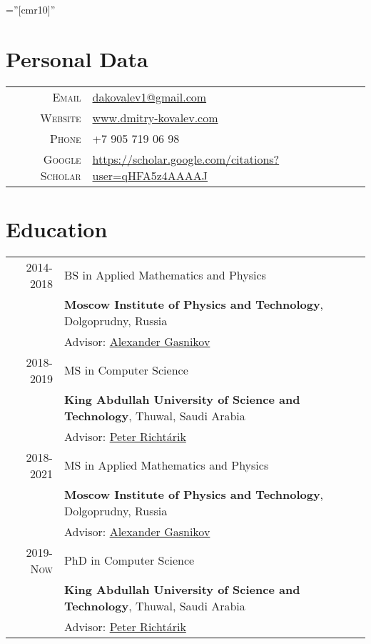 \documentclass[a4paper,10pt]{article} %
\begin{document}
\pagestyle{empty} %

\font\fb=''[cmr10]'' %


\par{\bigskip\par} %

\section{Personal Data}

\begin{tabular}{rl}
\textsc{Email} & \href{mailto:dakovalev1@gmail.com}{dakovalev1@gmail.com}\\
\textsc{Website} & \href{https://www.dmitry-kovalev.com}{www.dmitry-kovalev.com}\\
\textsc{Phone} & +7 905 719 06 98\\
\textsc{Google Scholar} &\href{https://scholar.google.com/citations?user=qHFA5z4AAAAJ}{https://scholar.google.com/citations?user=qHFA5z4AAAAJ}
\end{tabular}



\section{Education}
\begin{tabular}{rl}	
\textsc{2014-2018}& BS in Applied Mathematics and Physics\\
& \textbf{Moscow Institute of Physics and Technology}, Dolgoprudny, Russia\\
& Advisor: \href{https://scholar.google.com/citations?user=AmeE8qkAAAAJ}{Alexander Gasnikov}\\
\textsc{2018-2019}& MS in Computer Science\\
& \textbf{King Abdullah University of Science and Technology}, Thuwal, Saudi Arabia\\
& Advisor: \href{https://richtarik.org}{Peter Richt\'{a}rik}\\
\textsc{2018-2021}& MS in Applied Mathematics and Physics\\
& \textbf{Moscow Institute of Physics and Technology}, Dolgoprudny, Russia\\
& Advisor: \href{https://scholar.google.com/citations?user=AmeE8qkAAAAJ}{Alexander Gasnikov}\\
\textsc{2019-Now}& PhD in Computer Science\\
& \textbf{King Abdullah University of Science and Technology}, Thuwal, Saudi Arabia\\
& Advisor: \href{https://richtarik.org}{Peter Richt\'{a}rik}\\
\end{tabular}
\end{document}
